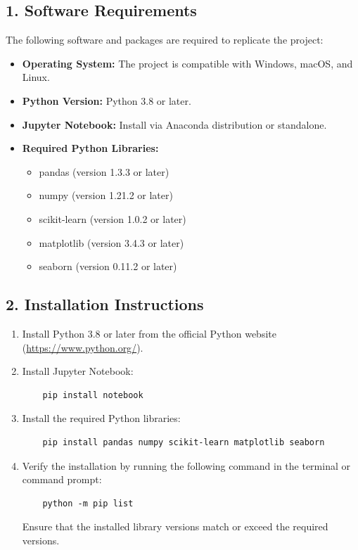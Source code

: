 \documentclass[10pt,twocolumn]{article}
\begin{document}
\begin{itemize}
\subsection*{1. Software Requirements}
The following software and packages are required to replicate the project:
\begin{itemize}
    \item \textbf{Operating System:} The project is compatible with Windows, macOS, and Linux.
    \item \textbf{Python Version:} Python 3.8 or later.
    \item \textbf{Jupyter Notebook:} Install via Anaconda distribution or standalone.
    \item \textbf{Required Python Libraries:}
    \begin{itemize}
        \item pandas (version 1.3.3 or later)
        \item numpy (version 1.21.2 or later)
        \item scikit-learn (version 1.0.2 or later)
        \item matplotlib (version 3.4.3 or later)
        \item seaborn (version 0.11.2 or later)
    \end{itemize}
\end{itemize}

\subsection*{2. Installation Instructions}
\begin{enumerate}
    \item Install Python 3.8 or later from the official Python website (\url{https://www.python.org/}).
    \item Install Jupyter Notebook:
    \begin{verbatim}
    pip install notebook
    \end{verbatim}
    \item Install the required Python libraries:
    \begin{verbatim}
    pip install pandas numpy scikit-learn matplotlib seaborn
    \end{verbatim}
    \item Verify the installation by running the following command in the terminal or command prompt:
    \begin{verbatim}
    python -m pip list
    \end{verbatim}
    Ensure that the installed library versions match or exceed the required versions.
\end{enumerate}


\end{itemize}
\end{document}
